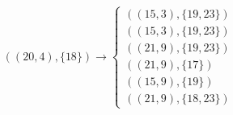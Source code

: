 \begin{minipage}{5.0cm}
\vspace{-1cm}


%
\fontsize{8}{10}\selectfont \[((20,4),\{18\}) \rightarrow \begin{cases}
((15,3),\{19,23\}) \\
((15,3),\{19,23\}) \\
((21,9),\{19,23\}) \\
((21,9),\{17\})\\
((15,9),\{19\}) \\
((21,9),\{18,23\}) 
\end{cases}\]
%
\end{minipage}
